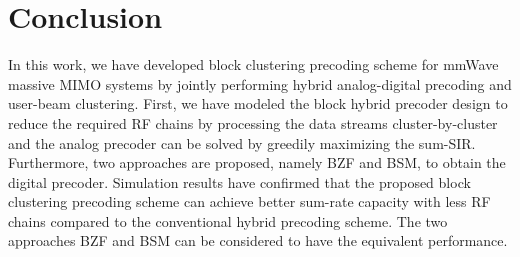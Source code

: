 \documentclass[conference]{IEEEtran}
\begin{document}
\section{Conclusion}
In this work, we have developed block clustering precoding scheme for mmWave massive MIMO systems by jointly performing hybrid analog-digital precoding and user-beam clustering. First, we have modeled the block hybrid precoder design to reduce the required RF chains by processing the data streams cluster-by-cluster and the analog precoder can be solved by greedily maximizing the sum-SIR. Furthermore, two approaches are proposed, namely BZF and BSM, to obtain the digital precoder. Simulation results have confirmed that the proposed block clustering precoding scheme can achieve better sum-rate capacity with less RF chains compared to the conventional hybrid precoding scheme. The two approaches BZF and BSM can be considered to have the equivalent performance.






\end{document}
